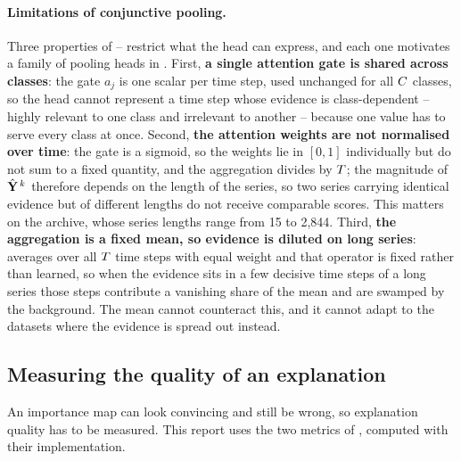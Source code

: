 \paragraph{Limitations of conjunctive pooling.}
Three properties of -- restrict what the head can express, and
each one motivates a family of pooling heads in . First,
\textbf{a single attention gate is shared across classes}: the gate $a_j$ is one scalar per time
step, used unchanged for all $C$ classes, so the head cannot represent a time step whose
evidence is class-dependent -- highly relevant to one class and irrelevant to another -- because one
value has to serve every class at once. Second, \textbf{the attention weights are not normalised
over time}: the gate is a sigmoid, so the weights lie in $[0,1]$ individually but do not sum to a
fixed quantity, and the aggregation divides by $T$; the magnitude of $\hat{\mathbf{Y}}^{\,k}$
therefore depends on the length of the series, so two series carrying identical evidence but of
different lengths do not receive comparable scores. This matters on the \ucr{} archive, whose series
lengths range from 15 to 2{,}844. Third, \textbf{the aggregation is a fixed mean, so evidence is
diluted on long series}:  averages over all $T$ time steps with equal weight
and that operator is fixed rather than learned, so when the evidence sits in a few decisive time
steps of a long series those steps contribute a vanishing share of the mean and are swamped by the
background. The mean cannot counteract this, and it cannot adapt to the datasets where the evidence
is spread out instead.

\subsection{Measuring the quality of an explanation}
\label{sec:bg:metrics}

An importance map can look convincing and still be wrong, so explanation quality has to be measured.
This report uses the two metrics of \citet{early2024millet}, computed with their implementation.

